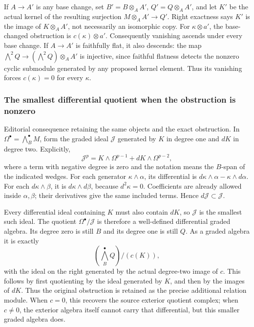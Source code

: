 If \(A\to A'\) is any base change, set \(B'=B\otimes_A A'\), \(Q'=Q\otimes_A A'\), and let \(K'\) be the actual kernel of the resulting surjection \(M\otimes_A A'\to Q'\). Right exactness says \(K'\) is the image of \(K\otimes_A A'\), not necessarily an isomorphic copy. For \(\kappa\otimes a'\), the base-changed obstruction is \(c(\kappa)\otimes a'\). Consequently vanishing ascends under every base change. If \(A\to A'\) is faithfully flat, it also descends: the map \(\bigwedge^2Q\to(\bigwedge^2Q)\otimes_A A'\) is injective, since faithful flatness detects the nonzero cyclic submodule generated by any proposed kernel element. Thus its vanishing forces \(c(\kappa)=0\) for every \(\kappa\).

\subsubsection{The smallest differential quotient when the obstruction is nonzero}\label{algebra-proof-042-the-smallest-differential-quotient-when-the-obstruction-is-nonzero}

Editorial consequence retaining the same objects and the exact obstruction. In \(\Omega^\bullet=\bigwedge_B^\bullet M\), form the graded ideal \(\mathcal J\) generated by \(K\) in degree one and \(dK\) in degree two. Explicitly, \[
\mathcal J^p=K\wedge\Omega^{p-1}+dK\wedge\Omega^{p-2},
\] where a term with negative degree is zero and the notation means the \(B\)-span of the indicated wedges. For each generator \(\kappa\wedge\alpha\), its differential is \(d\kappa\wedge\alpha-\kappa\wedge d\alpha\). For each \(d\kappa\wedge\beta\), it is \(d\kappa\wedge d\beta\), because \(d^2\kappa=0\). Coefficients are already allowed inside \(\alpha,\beta\); their derivatives give the same included terms. Hence \(d\mathcal J\subset\mathcal J\).

Every differential ideal containing \(K\) must also contain \(dK\), so \(\mathcal J\) is the smallest such ideal. The quotient \(\Omega^\bullet/\mathcal J\) is therefore a well-defined differential graded algebra. Its degree zero is still \(B\) and its degree one is still \(Q\). As a graded algebra it is exactly \[
\left(\bigwedge_B^\bullet Q\right)\big/\left(c(K)\right),
\] with the ideal on the right generated by the actual degree-two image of \(c\). This follows by first quotienting by the ideal generated by \(K\), and then by the images of \(dK\). Thus the original obstruction is retained as the precise additional relation module. When \(c=0\), this recovers the source exterior quotient complex; when \(c\ne0\), the exterior algebra itself cannot carry that differential, but this smaller graded algebra does.

